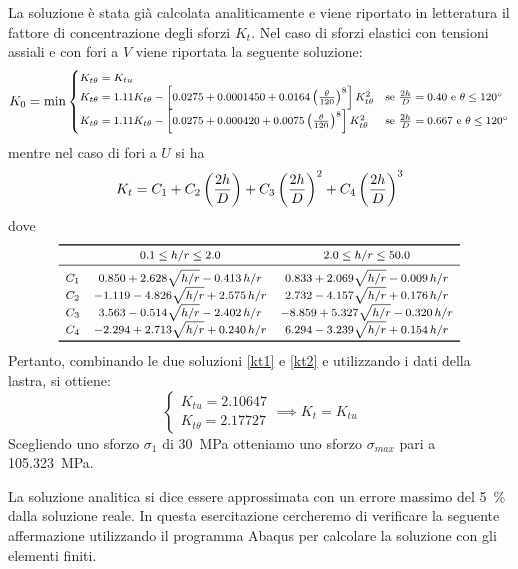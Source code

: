 La soluzione è stata già calcolata analiticamente e viene riportato in letteratura il fattore di concentrazione degli sforzi $K_t$.
Nel caso di sforzi elastici con tensioni assiali e con fori a $V$ viene riportata la seguente soluzione:
\begin{equation}\footnotesize\label{kt1}
K_0=\min
\begin{cases}
K_{t\theta}=K_{tu} & \\
K_{t\theta} = 1.11 K_{t\theta} - \left[0.0275 + 0.0001450 + 0.0164\left(\frac{\theta}{120}\right)^8\right]K_{t\theta}^2 & \text{se $\frac{2h}{D} = 0.40$ e $\theta\le \ang{120}$}\\
K_{t\theta} = 1.11 K_{t\theta} - \left[0.0275 + 0.000420 + 0.0075\left(\frac{\theta}{120}\right)^8\right]K_{t\theta}^2 & \text{se $\frac{2h}{D} = 0.667$ e $\theta\le \ang{120}$}
\end{cases}
\end{equation} 
mentre nel caso di fori a $U$ si ha
\begin{equation}\footnotesize\label{kt2}
K_t = C_1 + C_2\left(\frac{2h}{D}\right) + C_3\left(\frac{2h}{D}\right)^2 + C_4\left(\frac{2h}{D}\right)^3
\end{equation} 
dove 
\[ \footnotesize
\begin{array}{ccc}
\toprule
 & 0.1\le h/r\le 2.0 & 2.0\le h/r\le 50.0 \\ \midrule
C_1 & 0.850+2.628\sqrt{h/r}-0.413\,h/r & 0.833+2.069\sqrt{h/r}-0.009\,h/r \\ 
C_2 & -1.119-4.826\sqrt{h/r}+2.575\,h/r & 2.732-4.157\sqrt{h/r}+0.176\,h/r \\  
C_3 & 3.563-0.514\sqrt{h/r}-2.402\,h/r & -8.859+5.327\sqrt{h/r}-0.320\,h/r \\  
C_4 & -2.294 + 2.713\sqrt{h/r}+0.240\,h/r & 6.294-3.239\sqrt{h/r}+0.154\,h/r \\  \bottomrule
\end{array}
\]
Pertanto, combinando le due soluzioni \eqref{kt1} e \eqref{kt2} e utilizzando i dati della lastra, si ottiene:
\[
\begin{cases}
K_{tu}=2.10647\\
K_{t\theta}=2.17727
\end{cases} \implies K_t = K_{tu}
\]
Scegliendo uno sforzo $\sigma_1$ di \SI{30}{\mega\pascal} otteniamo uno sforzo $\sigma_{max}$ pari a \SI{105.323}{\mega\pascal}.

La soluzione analitica si dice essere approssimata con un errore massimo del \SI{5}{\%} dalla soluzione reale. 
In questa esercitazione cercheremo di verificare la seguente affermazione utilizzando il programma Abaqus per calcolare la soluzione con gli elementi finiti.
